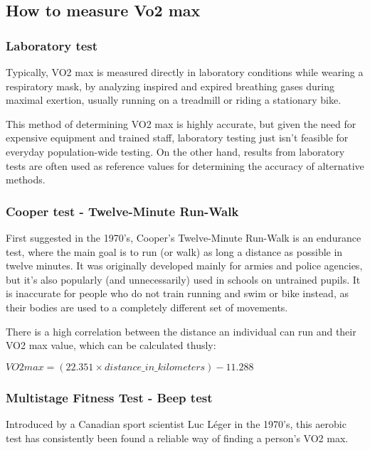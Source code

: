 \subsection*{How to measure Vo2 max}

\subsubsection*{Laboratory test}

Typically, VO2 max is measured directly in laboratory conditions while wearing a respiratory mask, by analyzing inspired and expired breathing gases during maximal exertion,\cite{vo2max-definition} usually running on a treadmill or riding a stationary bike.

This method of determining VO2 max is highly accurate, but given the need for expensive equipment and trained staff, laboratory testing just isn't feasible for everyday population-wide testing.
On the other hand, results from laboratory tests are often used as reference values for determining the accuracy of alternative methods.

\subsubsection*{Cooper test - Twelve-Minute Run-Walk}

First suggested in the 1970's, Cooper's Twelve-Minute Run-Walk is an endurance test, where the main goal is to run (or walk) as long a distance as possible in twelve minutes.
It was originally developed mainly for armies and police agencies, but it's also popularly (and unnecessarily\cite{cooper-pupils}) used in schools on untrained pupils.
It is inaccurate for people who do not train running and swim or bike instead, as their bodies are used to a completely different set of movements.

There is a high correlation between the distance an individual can run and their VO2 max value, which can be calculated thusly:

$VO2max = (22.351 \times distance\_in\_kilometers) - 11.288$\cite{cooper-vo2max}

\subsubsection*{Multistage Fitness Test - Beep test}

Introduced by a Canadian sport scientist Luc Léger in the 1970's, this aerobic test has consistently been found a reliable way of finding a person's VO2 max.

